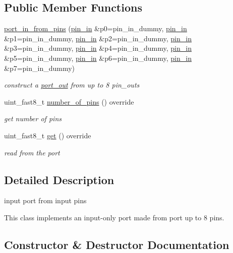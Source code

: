 \subsection*{Public Member Functions}
\begin{DoxyCompactItemize}
\item 
\hyperlink{classhwlib_1_1port__in__from__pins_ab7193755e6819043946e90f1dfafd70f}{port\+\_\+in\+\_\+from\+\_\+pins} (\hyperlink{classhwlib_1_1pin__in}{pin\+\_\+in} \&p0=pin\+\_\+in\+\_\+dummy, \hyperlink{classhwlib_1_1pin__in}{pin\+\_\+in} \&p1=pin\+\_\+in\+\_\+dummy, \hyperlink{classhwlib_1_1pin__in}{pin\+\_\+in} \&p2=pin\+\_\+in\+\_\+dummy, \hyperlink{classhwlib_1_1pin__in}{pin\+\_\+in} \&p3=pin\+\_\+in\+\_\+dummy, \hyperlink{classhwlib_1_1pin__in}{pin\+\_\+in} \&p4=pin\+\_\+in\+\_\+dummy, \hyperlink{classhwlib_1_1pin__in}{pin\+\_\+in} \&p5=pin\+\_\+in\+\_\+dummy, \hyperlink{classhwlib_1_1pin__in}{pin\+\_\+in} \&p6=pin\+\_\+in\+\_\+dummy, \hyperlink{classhwlib_1_1pin__in}{pin\+\_\+in} \&p7=pin\+\_\+in\+\_\+dummy)
\begin{DoxyCompactList}\small\item\em construct a \hyperlink{classhwlib_1_1port__out}{port\+\_\+out} from up to 8 pin\+\_\+outs \end{DoxyCompactList}\item 
uint\+\_\+fast8\+\_\+t \hyperlink{classhwlib_1_1port__in__from__pins_a7221f55f0bcee8b8aa56203141c90716}{number\+\_\+of\+\_\+pins} () override
\begin{DoxyCompactList}\small\item\em get number of pins \end{DoxyCompactList}\item 
uint\+\_\+fast8\+\_\+t \hyperlink{classhwlib_1_1port__in__from__pins_af137729dd87345ceb643b9dad3d6d274}{get} () override
\begin{DoxyCompactList}\small\item\em read from the port \end{DoxyCompactList}\end{DoxyCompactItemize}


\subsection{Detailed Description}
input port from input pins 

This class implements an input-\/only port made from port up to 8 pins. 

\subsection{Constructor \& Destructor Documentation}
